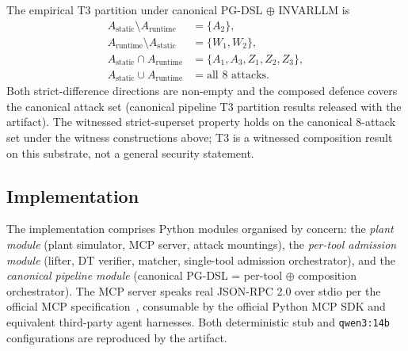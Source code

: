 The empirical T3 partition under canonical PG-DSL $\oplus$ INVARLLM is
\begin{align*}
A_{\text{static}} \setminus A_{\text{runtime}} &= \{A_2\}, \\
A_{\text{runtime}} \setminus A_{\text{static}} &= \{W_1, W_2\}, \\
A_{\text{static}} \cap A_{\text{runtime}} &= \{A_1, A_3, Z_1, Z_2, Z_3\}, \\
A_{\text{static}} \cup A_{\text{runtime}} &= \text{all 8 attacks}.
\end{align*}
Both strict-difference directions are non-empty and the composed
defence covers the canonical attack set (canonical pipeline T3
partition results released with the artifact). The witnessed
strict-superset property holds on the canonical 8-attack set under
the witness constructions above; T3 is a witnessed composition
result on this substrate, not a general security statement.

\subsection{Implementation}

The implementation comprises Python modules organised by concern:
the \emph{plant module} (plant simulator, MCP server, attack
mountings), the \emph{per-tool admission module} (lifter, DT
verifier, matcher, single-tool admission orchestrator), and the
\emph{canonical pipeline module} (canonical PG-DSL = per-tool
$\oplus$ composition orchestrator). The MCP server speaks real
JSON-RPC 2.0 over stdio per the official MCP
specification~\cite{mcp_spec}, consumable by the official Python MCP
SDK and equivalent third-party agent harnesses. Both deterministic
stub and \texttt{qwen3:14b} configurations are reproduced by the
artifact.


